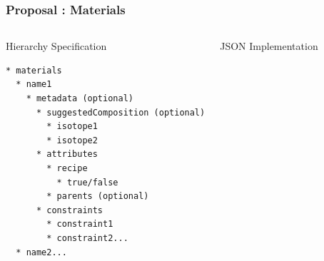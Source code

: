 \begin{frame}[fragile]
  \frametitle{Proposal : Materials}
  \begin{columns}[t]
    \begin{block}{Hierarchy Specification}\begin{small}\begin{verbatim}
* materials
  * name1
    * metadata (optional)
      * suggestedComposition (optional)
        * isotope1
        * isotope2
      * attributes
        * recipe
          * true/false
        * parents (optional)
      * constraints
        * constraint1
        * constraint2...
  * name2...
    \end{verbatim}\end{small}\end{block}
    \begin{block}{JSON Implementation}\begin{small}\begin{semiverbatim}
      \end{semiverbatim}\end{small}\end{block}
  \end{columns}
\end{frame}

